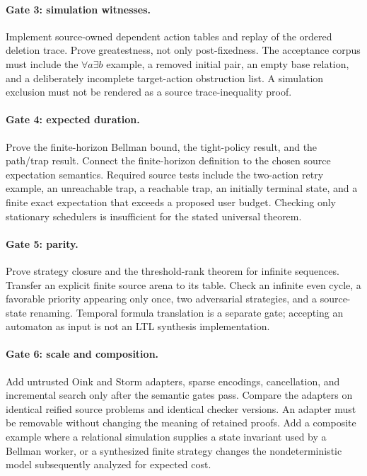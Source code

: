 \paragraph{Gate 3: simulation witnesses.}
Implement source-owned dependent action tables and replay of the ordered
deletion trace. Prove greatestness, not only post-fixedness. The acceptance
corpus must include the $\forall a\exists b$ example, a removed initial pair,
an empty base relation, and a deliberately incomplete target-action obstruction
list. A simulation exclusion must not be rendered as a source trace-inequality
proof.

\paragraph{Gate 4: expected duration.}
Prove the finite-horizon Bellman bound, the tight-policy result, and the
path/trap result. Connect the finite-horizon definition to the chosen source
expectation semantics. Required source tests include the two-action retry
example, an unreachable trap, a reachable trap, an initially terminal state,
and a finite exact expectation that exceeds a proposed user budget. Checking
only stationary schedulers is insufficient for the stated universal theorem.

\paragraph{Gate 5: parity.}
Prove strategy closure and the threshold-rank theorem for infinite sequences.
Transfer an explicit finite source arena to its table. Check an infinite even
cycle, a favorable priority appearing only once, two adversarial strategies,
and a source-state renaming. Temporal formula translation is a separate gate;
accepting an automaton as input is not an LTL synthesis implementation.

\paragraph{Gate 6: scale and composition.}
Add untrusted Oink and Storm adapters, sparse encodings, cancellation, and
incremental search only after the semantic gates pass. Compare the adapters
on identical reified source problems and identical checker versions. An
adapter must be removable without changing the meaning of retained proofs.
Add a composite example where a relational simulation supplies a state
invariant used by a Bellman worker, or a synthesized finite strategy changes
the nondeterministic model subsequently analyzed for expected cost.

